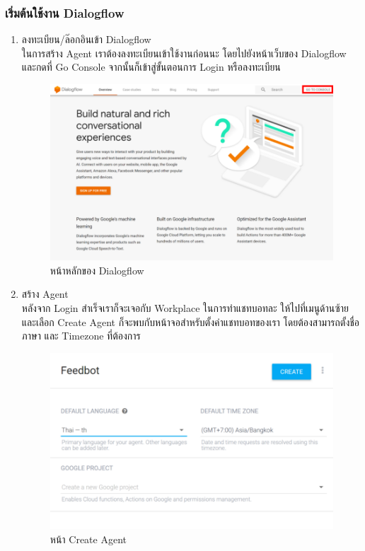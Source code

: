 \subsubsection{เริ่มต้นใช้งาน Dialogflow} 

\begin{enumerate}[label=\arabic*)]
\item ลงทะเบียน/ล๊อกอินเข้า Dialogflow \\
ในการสร้าง Agent เราต้องลงทะเบียนเข้าใช้งานก่อนนะ โดยไปยังหน้าเว็บของ Dialogflow และกดที่ Go Console จากนั้นก็เข้าสู่ขั้นตอนการ Login หรือลงทะเบียน

	\begin{figure}[H]
		\centering
		\includegraphics[width=0.9\columnwidth]{Figures/2/dialogflow_1}
		\caption{หน้าหลักของ Dialogflow}
		\label{Fig:dialogflow1}
	\end{figure}

\item สร้าง Agent \\
หลังจาก Login สำเร็จเราก็จะเจอกับ Workplace ในการทำแชทบอทละ ให้ไปที่เมนูด้านซ้าย และเลือก Create Agent ก็จะพบกับหน้าจอสำหรับตั้งค่าแชทบอทของเรา โดยต้องสามารถตั้งชื่อ ภาษา และ Timezone ที่ต้องการ

	\begin{figure}[H]
		\centering
		\includegraphics[width=0.9\columnwidth]{Figures/2/dialogflow_2}
		\caption{หน้า Create Agent}
		\label{Fig:dialogflow2}
	\end{figure}


\end{enumerate}
